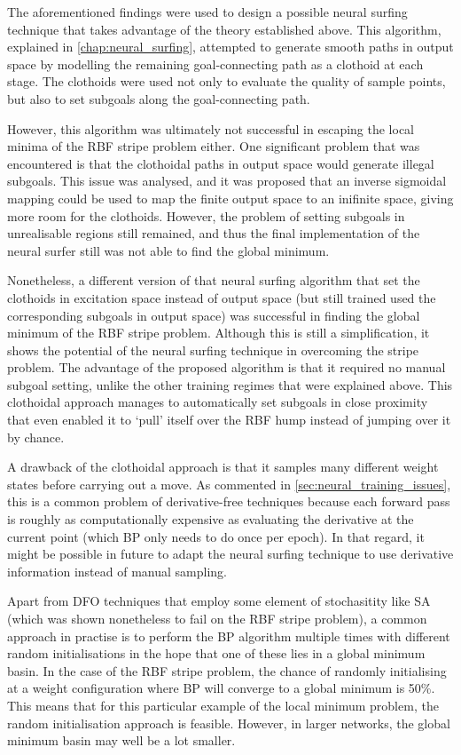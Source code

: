 The aforementioned findings were used to design a possible neural surfing technique that takes advantage of the theory established above.
This algorithm, explained in \ref{chap:neural_surfing}, attempted to generate smooth paths in output space by modelling the remaining goal-connecting path as a clothoid at each stage.
The clothoids were used not only to evaluate the quality of sample points, but also to set subgoals along the goal-connecting path.

However, this algorithm was ultimately not successful in escaping the local minima of the RBF stripe problem either.
One significant problem that was encountered is that the clothoidal paths in output space would generate illegal subgoals.
This issue was analysed, and it was proposed that an inverse sigmoidal mapping could be used to map the finite output space to an inifinite space, giving more room for the clothoids.
However, the problem of setting subgoals in unrealisable regions still remained, and thus the final implementation of the neural surfer still was not able to find the global minimum.

Nonetheless, a different version of that neural surfing algorithm that set the clothoids in excitation space instead of output space (but still trained used the corresponding subgoals in output space) was successful in finding the global minimum of the RBF stripe problem.
Although this is still a simplification, it shows the potential of the neural surfing technique in overcoming the stripe problem.
The advantage of the proposed algorithm is that it required no manual subgoal setting, unlike the other training regimes that were explained above.
This clothoidal approach manages to automatically set subgoals in close proximity that even enabled it to `pull' itself over the RBF hump instead of jumping over it by chance.

A drawback of the clothoidal approach is that it samples many different weight states before carrying out a move.
As commented in \ref{sec:neural_training_issues}, this is a common problem of derivative-free techniques because each forward pass is roughly as computationally expensive as evaluating the derivative at the current point (which BP only needs to do once per epoch).
In that regard, it might be possible in future to adapt the neural surfing technique to use derivative information instead of manual sampling.

Apart from DFO techniques that employ some element of stochasitity like SA (which was shown nonetheless to fail on the RBF stripe problem),
a common approach in practise is to perform the BP algorithm multiple times with different random initialisations in the hope that one of these lies in a global minimum basin.
In the case of the RBF stripe problem, the chance of randomly initialising at a weight configuration where BP will converge to a global minimum is 50\%.
This means that for this particular example of the local minimum problem, the random initialisation approach is feasible.
However, in larger networks, the global minimum basin may well be a lot smaller.

